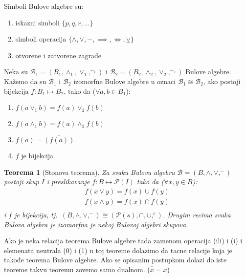 \documentclass[12p,14paper]{article}
\newtheorem*{theorem}{Teorema}
\begin{document}
\begin{multicols}{2}
    Simboli Bulove algebre su:
    \begin{enumerate}
        \itemsep0em
        \item iskazni simboli $\{ p, q, r, \ldots \}$
        \item simboli operacija $\{ \land, \lor, -, \implies, \iff, \veebar \}$
        \item otvorene i zatvorene zagrade
    \end{enumerate}

    Neka su $\mathcal{B}_1 = (B_1, \land_1, \lor_1, ^{-_1})$ i 
    $\mathcal{B}_2 = (B_2, \land_2, \lor_2, ^{-_2})$ Bulove algebre. 
    Kažemo da su 
    $\mathcal{B}_1$ i $\mathcal{B}_2$ izomorfne Bulove algebre u oznaci 
    $\mathcal{B}_1 \cong \mathcal{B}_2$, ako postoji bijekcija 
    $f : B_1 \mapsto B_2$, tako da ($\forall a, b \in B_1$):
    \begin{enumerate}{}
        \itemsep0em
        \item $f(a \lor_1 b) = f(a) \lor_2 f(b)$
        \item $f(a \land_1 b) = f(a) \land_2 f(b)$
        \item $f(\overline{a}) = \overline{(f(a))}$
        \item $f$ je bijekcija
    \end{enumerate}

    \begin{theorem}[Stonova teorema]
        Za svaku Bulovu algebru $\mathcal{B} = (B, \land, \lor, ^{-})$ postoji 
        skup $I$ i preslikavanje $f : B \mapsto \mathcal{P}(I)$ tako da 
        ($\forall x,y \in B$):
        \begin{align*}
            f(x \lor y) = f(x) \cup f(y) \\
            f(x \land y) = f(x) \cap f(y) \\
        \end{align*}
        i $f$ je bijekcija, tj.\ 
        $(B, \land, \lor, ^{-}) \cong (\mathcal{P}(s), \cap, \cup, ^{c})$.
        Drugim recima svaka Bulova algebra je izomorfna je nekoj Bulovoj
        algebri skupova.
    \end{theorem}

    Ako je neka relacija teorema Bulove algebre tada zamenom operacija (ili) i 
    (i) i elemenata neutrala (0) i (1) u toj teoreme dolazimo da tacne 
    relacije koja je takođe teorema Bulove algebre. Ako se opisanim postupkom 
    dolazi do iste teoreme takvu teoremu zovemo samo dualnom. 
    ($\overline{\overline{x}} = x$)


\end{multicols}
\end{document}
